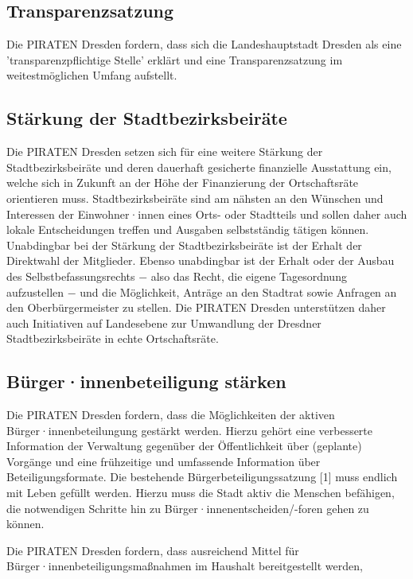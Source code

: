 \documentclass[a4paper, 11pt]{article}
\begin{document}
\subsection{Transparenzsatzung}
Die PIRATEN Dresden fordern, dass sich die Landeshauptstadt Dresden als eine 'transparenzpflichtige Stelle' erklärt und eine Transparenzsatzung im weitestmöglichen Umfang aufstellt.


\subsection{Stärkung der Stadtbezirksbeiräte}
Die PIRATEN Dresden setzen sich für eine weitere Stärkung der Stadtbezirksbeiräte und deren dauerhaft gesicherte finanzielle Ausstattung ein, welche sich in Zukunft an der Höhe der Finanzierung der Ortschaftsräte orientieren muss. Stadtbezirksbeiräte sind am nähsten an den Wünschen und Interessen der Einwohner·innen eines Orts- oder Stadtteils und sollen daher auch lokale Entscheidungen treffen und Ausgaben selbstständig tätigen können. Unabdingbar bei der Stärkung der Stadtbezirksbeiräte ist der Erhalt der Direktwahl der Mitglieder. Ebenso unabdingbar ist der Erhalt oder der Ausbau des Selbstbefassungsrechts $-$ also das Recht, die eigene Tagesordnung aufzustellen $-$ und die Möglichkeit, Anträge an den Stadtrat sowie Anfragen an den Oberbürgermeister zu stellen. Die PIRATEN Dresden unterstützen daher auch Initiativen auf Landesebene zur Umwandlung der Dresdner Stadtbezirksbeiräte in echte Ortschaftsräte.


\subsection{Bürger·innenbeteiligung stärken}
Die PIRATEN Dresden fordern, dass die Möglichkeiten der aktiven Bürger·innenbeteilungung gestärkt werden. Hierzu gehört eine verbesserte Information der Verwaltung gegenüber der Öffentlichkeit über (geplante) Vorgänge und eine frühzeitige und umfassende Information über Beteiligungsformate. Die bestehende Bürgerbeteiligungssatzung [1] muss endlich mit Leben gefüllt werden. Hierzu muss die Stadt aktiv die Menschen befähigen, die notwendigen Schritte hin zu Bürger·innenentscheiden/-foren gehen zu können.\newline

Die PIRATEN Dresden fordern, dass ausreichend Mittel für Bürger·innenbeteiligungsmaßnahmen im Haushalt bereitgestellt werden,
\end{document}
